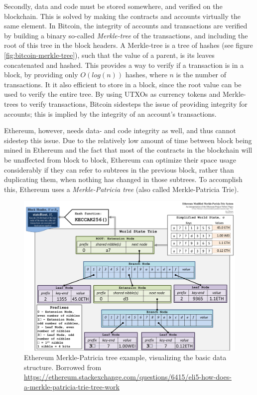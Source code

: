 \documentclass{article}
\begin{document}
			Secondly, data and code must be stored somewhere, and verified on the blockchain.
			This is solved by making the contracts and accounts virtually the same element.  
			In Bitcoin, the integrity of accounts and transactions are verified by building a binary so-called \emph{Merkle-tree} of the transactions, and including the root of this tree in the block headers. 
			A Merkle-tree is a tree of hashes (see figure \ref{fig:bitcoin-merkle-tree}), such that the value of a parent, is its leaves concatenated and hashed. 
			This provides a way to verify if a transaction is in a block, by providing only $O(log(n))$ hashes, where $n$ is the number of transactions.
			It it also efficient to store in a block, since the root value can be used to verify the entire tree.
			By using UTXOs as currency tokens and Merkle-trees to verify transactions, Bitcoin sidesteps the issue of providing integrity for accounts; this is implied by the integrity of an account's transactions. 

			Ethereum, however, needs data- and code integrity as well, and thus cannot sidestep this issue.
			Due to the relatively low amount of time between block being mined in Ethereum and the fact that most of the contracts in the blockchain will be unaffected from block to block, Ethereum can optimize their space usage considerably if they can refer to subtrees in the previous block, rather than duplicating them, when nothing has changed in those subtrees. 
			To accomplish this, Ethereum uses a \emph{Merkle-Patricia tree} (also called Merkle-Patricia Trie). 

			\begin{figure}[!ht]
				\centering
				\includegraphics[scale=0.14]{figures/merkle-patricia-tree.png}
			 	\caption[Ethereum Merkle-Patricia tree example]
			 	{Ethereum Merkle-Patricia tree example, visualizing the basic data structure. Borrowed from \url{https://ethereum.stackexchange.com/questions/6415/eli5-how-does-a-merkle-patricia-trie-tree-work}}
			 	\label{fig:merkle-patricia-tree}
			\end{figure}
\end{document}
